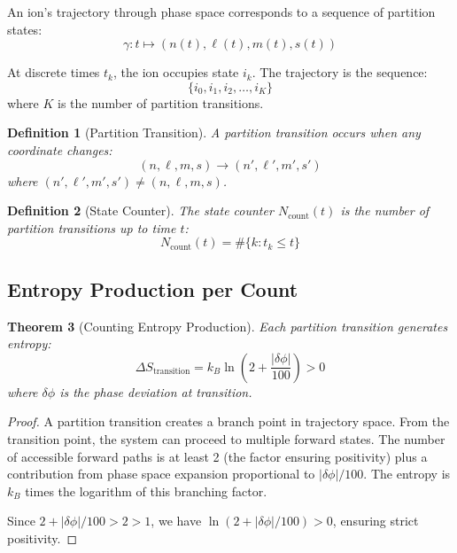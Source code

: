 \documentclass[twocolumn,10pt]{article}
\newtheorem{theorem}{Theorem}[section]
\newtheorem{definition}[theorem]{Definition}
\begin{document}
An ion's trajectory through phase space corresponds to a sequence of partition states:
\begin{equation}
    \gamma: t \mapsto (n(t), \ell(t), m(t), s(t))
\end{equation}

At discrete times $t_k$, the ion occupies state $i_k$. The trajectory is the sequence:
\begin{equation}
    \{i_0, i_1, i_2, \ldots, i_K\}
\end{equation}
where $K$ is the number of partition transitions.

\begin{definition}[Partition Transition]
A partition transition occurs when any coordinate changes:
\begin{equation}
    (n, \ell, m, s) \to (n', \ell', m', s')
\end{equation}
where $(n', \ell', m', s') \neq (n, \ell, m, s)$.
\end{definition}

\begin{definition}[State Counter]
The state counter $N_{\text{count}}(t)$ is the number of partition transitions up to time $t$:
\begin{equation}
    N_{\text{count}}(t) = \#\{k : t_k \leq t\}
\end{equation}
\end{definition}

\subsection{Entropy Production per Count}

\begin{theorem}[Counting Entropy Production]
\label{thm:counting_entropy}
Each partition transition generates entropy:
\begin{equation}
    \Delta S_{\text{transition}} = k_B \ln\left(2 + \frac{|\delta\phi|}{100}\right) > 0
\end{equation}
where $\delta\phi$ is the phase deviation at transition.
\end{theorem}

\begin{proof}
A partition transition creates a branch point in trajectory space. From the transition point, the system can proceed to multiple forward states. The number of accessible forward paths is at least 2 (the factor ensuring positivity) plus a contribution from phase space expansion proportional to $|\delta\phi|/100$. The entropy is $k_B$ times the logarithm of this branching factor.

Since $2 + |\delta\phi|/100 > 2 > 1$, we have $\ln(2 + |\delta\phi|/100) > 0$, ensuring strict positivity.
\end{proof}
\end{document}
